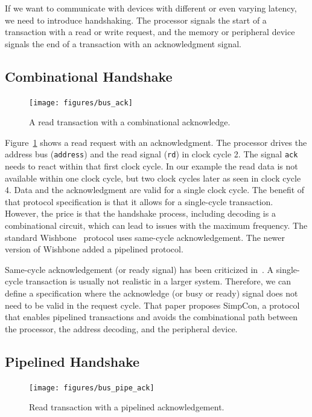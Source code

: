 \documentclass[%
    10pt,
    headinclude, footexclude,
    openright, %
    notitlepage,
    cleardoubleempty,
    headsepline,
    pointlessnumbers,
    bibtotoc, idxtotoc,
    ]{scrbook}
\newcommand{\code}[1]{{\lstinline[basicstyle=\small\ttfamily]{#1}}}
\begin{document}
If we want to communicate with devices with different or even varying latency, we need to
introduce handshaking. The processor signals the start of a
transaction with a read or write request, and the memory or peripheral device signals the end of a transaction with
an acknowledgment signal.

\subsection{Combinational Handshake}

\begin{figure}
  \centering
  \texttt{[image: figures/bus\_ack]}
  \caption{A read transaction with a combinational acknowledge.}
  \label{fig:bus_ack}
\end{figure}

Figure~\ref{fig:bus_ack} shows a read request with an acknowledgment.
The processor drives the address bus (\code{address}) and the read
signal (\code{rd}) in clock cycle 2. The signal \code{ack} needs to react
within that first clock cycle. In our example the read data is not available within
one clock cycle, but two clock cycles later as seen in clock cycle 4.
Data and the acknowledgment are valid for a single clock cycle.
The benefit of that protocol specification is that it allows for a single-cycle transaction.
However, the price is that the handshake process, including decoding is a combinational
circuit, which can lead to issues with the maximum frequency.
The standard Wishbone~\cite{soc:wishbone} protocol uses same-cycle
acknowledgement. The newer version of Wishbone added a pipelined
protocol.

Same-cycle acknowledgement (or ready signal) has been criticized in~\cite{simpcon}.
A single-cycle transaction is usually not realistic in a larger system. Therefore,
we can define a specification where the acknowledge (or busy or ready) signal
does not need to be valid in the request cycle.
That paper proposes SimpCon, a protocol that enables pipelined transactions and
avoids the combinational path between the processor, the address decoding, and the
peripheral device.

\subsection{Pipelined Handshake}

\begin{figure}
  \centering
  \texttt{[image: figures/bus\_pipe\_ack]}
  \caption{Read transaction with a pipelined acknowledgement.}
  \label{fig:bus_pipe_ack}
\end{figure}
\end{document}
